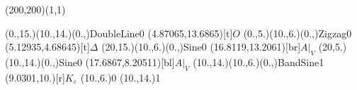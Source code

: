 \unitlength=1bp%

\begin{feynartspicture}(200,200)(1,1)

\FADiagram{}
\FAProp(0.,15.)(10.,14.)(0.,){DoubleLine}{0}
\FALabel(4.87065,13.6865)[t]{$O$}
\FAProp(0.,5.)(10.,6.)(0.,){Zigzag}{0}
\FALabel(5.12935,4.68645)[t]{$\Delta$}
\FAProp(20,15.)(10.,6.)(0.,){Sine}{0}
\FALabel(16.8119,13.2061)[br]{$A|_V$}
\FAProp(20,5.)(10.,14.)(0.,){Sine}{0}
\FALabel(17.6867,8.20511)[bl]{$A|_V$}
\FAProp(10.,14.)(10.,6.)(0.,){BandSine}{1}
\FALabel(9.0301,10.)[r]{$K_\varepsilon$}
\FAVert(10.,6.){0}
\FAVert(10.,14.){1}
\end{feynartspicture}

